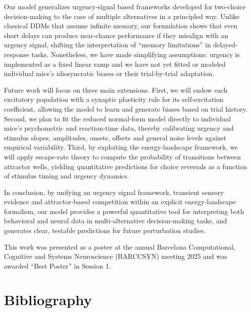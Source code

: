 \documentclass[12,twoside]{TFG-GM}
\theoremstyle{definition}
\theoremstyle{remark}
\begin{document}
Our model generalizes urgency‐signal based frameworks developed for two‐choice decision-making \cite{inagaki2019} to the case of multiple alternatives in a principled way. Unlike classical DDMs that assume infinite memory, our formulation shows that even short delays can produce near‐chance performance if they misalign with an urgency signal, shifting the interpretation of “memory limitations” in delayed‐response tasks. Nonetheless, we have made simplifying assumptions: urgency is implemented as a fixed linear ramp and we have not yet fitted or modeled individual mice’s idiosyncratic biases or their trial‐by‐trial adaptation.

Future work will focus on three main extensions. First, we will endow each excitatory population with a synaptic plasticity rule for its self‐excitation coefficient, allowing the model to learn and generate biases based on trial history. Second, we plan to fit the reduced normal‐form model directly to individual mice’s psychometric and reaction‐time data, thereby calibrating urgency and stimulus slopes, amplitudes, onsets, offsets and general noise levels against empirical variability. Third, by exploiting the energy‐landscape framework, we will apply escape‐rate theory to compute the probability of transitions between attractor wells, yielding quantitative predictions for choice reversals as a function of stimulus timing and urgency dynamics.

In conclusion, by unifying an urgency signal framework, transient sensory evidence and attractor‐based competition within an explicit energy‐landscape formalism, our model provides a powerful quantitative tool for interpreting both behavioral and neural data in multi‐alternative decision‐making tasks, and generates clear, testable predictions for future perturbation studies.


This work was presented as a poster at the annual Barcelona Computational, Cognitive and Systems Neuroscience (BARCCSYN) meeting 2025 and was awarded “Best Poster” in Session 1.
\newpage
\section{Bibliography}

%


\end{document}

